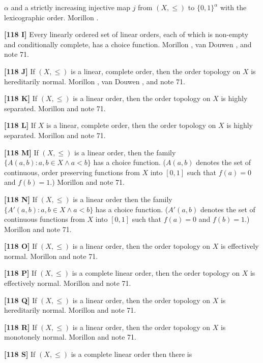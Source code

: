 $\alpha$ and a strictly increasing injective map $j$ from $(X,\le)$ to
$\{0,1\}^\alpha$ with the lexicographic order.  \ac{Morillon} \cite{1987}.
\smallskip
\item{}{\bf [118 I]}  Every linearly ordered set of linear orders, each
of which is non-empty and conditionally complete, has a choice function.
\ac{Morillon} \cite{1988}, van \ac{Douwen} \cite{1985}, and note 71.
\smallskip
\item{}{\bf [118 J]} If $(X,\le)$ is a linear, complete order, then the
order topology on $X$ is hereditarily normal.  \ac{Morillon} \cite{1988},
van \ac{Douwen} \cite{1985}, and note 71.
\smallskip
\item{}{\bf [118 K]} If $(X,\le)$ is a linear order, then the order
topology on $X$ is highly separated. \ac{Morillon} \cite{1988} and note 71.
\smallskip
\item{}{\bf [118 L]} If $X$ is a linear, complete order, then the order
topology on $X$ is highly separated.  \ac{Morillon} \cite{1988} and note 71.
\smallskip
\item{}{\bf [118 M]} If $(X,\le)$ is a linear order, then the family
$\{A(a,b): a, b\in X \land a< b\}$ has a choice function.  ($A(a,b)$
denotes the set of continuous, order preserving functions from $X$ into
$[0,1]$ such that $f(a)= 0$ and $f(b) = 1$.)  \ac{Morillon} \cite{1988}
and note 71.
\smallskip
\item{}{\bf [118 N]} If $(X,\le)$ is a linear order then the family
$\{A'(a,b): a, b\in X \land a< b\}$ has a choice function. ($A'(a,b)$
denotes the set of continuous functions from $X$ into $[0,1]$ such
that $f(a)= 0$ and $f(b) = 1$.)  \ac{Morillon} \cite{1988} and note 71.
\smallskip
\item{}{\bf [118 O]} If $(X,\le)$ is a linear order, then the order
topology on $X$ is effectively normal.  \ac{Morillon} \cite{1988} and
note 71.
\smallskip
\item{}{\bf [118 P]} If $(X,\le)$ is a complete linear order, then the
order topology on $X$ is effectively normal.  \ac{Morillon} \cite{1988}
and note 71.
\smallskip
\item{}{\bf [118 Q]} If $(X,\le)$ is a linear order, then the order
topology on $X$ is hereditarily normal.  \ac{Morillon} \cite{1988} and
note 71.
\smallskip
\item{}{\bf [118 R]} If $(X,\le)$ is a linear order, then the order
topology on $X$ is monotonely normal.  \ac{Morillon} \cite{1987} and
note 71.
\smallskip
\item{}{\bf [118 S]} If $(X,\le)$ is a complete linear order then there is
